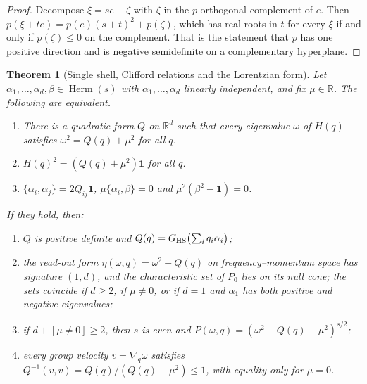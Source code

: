 \documentclass[12pt]{article}
\newtheorem{theorem}{Theorem}
\theoremstyle{definition}
\theoremstyle{remark}
\newcommand{\Herm}{\operatorname{Herm}}
\begin{document}
\begin{proof}
Decompose $\xi=se+\zeta$ with $\zeta$ in the $p$-orthogonal complement of $e$. Then $p(\xi+te)=p(e)(s+t)^2+p(\zeta)$, which has real roots in $t$ for every $\xi$ if and only if $p(\zeta)\le0$ on the complement. That is the statement that $p$ has one positive direction and is negative semidefinite on a complementary hyperplane.
\end{proof}

\begin{theorem}[Single shell, Clifford relations and the Lorentzian form]
\label{thm:shell}
Let $\alpha_1,\dots,\alpha_d,\beta\in\Herm(s)$ with $\alpha_1,\dots,\alpha_d$ linearly independent, and fix $\mu\in\mathbb R$. The following are equivalent.
\begin{enumerate}
\item[(a)] There is a quadratic form $Q$ on $\mathbb R^d$ such that every eigenvalue $\omega$ of $H(q)$ satisfies $\omega^2=Q(q)+\mu^2$ for all $q$.
\item[(b)] $H(q)^2=(Q(q)+\mu^2)\mathbf 1$ for all $q$.
\item[(c)] $\{\alpha_i,\alpha_j\}=2Q_{ij}\mathbf 1$, $\mu\{\alpha_i,\beta\}=0$ and $\mu^2(\beta^2-\mathbf 1)=0$.
\end{enumerate}
If they hold, then:
\begin{enumerate}
\item $Q$ is positive definite and $Q(q)=G_{\rm HS}\bigl(\sum_iq_i\alpha_i\bigr)$;
\item the read-out form $\eta(\omega,q)=\omega^2-Q(q)$ on frequency--momentum space has signature $(1,d)$, and the characteristic set of $P_0$ lies on its null cone; the sets coincide if $d\ge2$, if $\mu\ne0$, or if $d=1$ and $\alpha_1$ has both positive and negative eigenvalues;
\item if $d+[\mu\neq0]\ge2$, then $s$ is even and $P(\omega,q)=(\omega^2-Q(q)-\mu^2)^{s/2}$;
\item every group velocity $v=\nabla_q\omega$ satisfies $Q^{-1}(v,v)=Q(q)/(Q(q)+\mu^2)\le1$, with equality only for $\mu=0$.
\end{enumerate}
\end{theorem}
\end{document}
